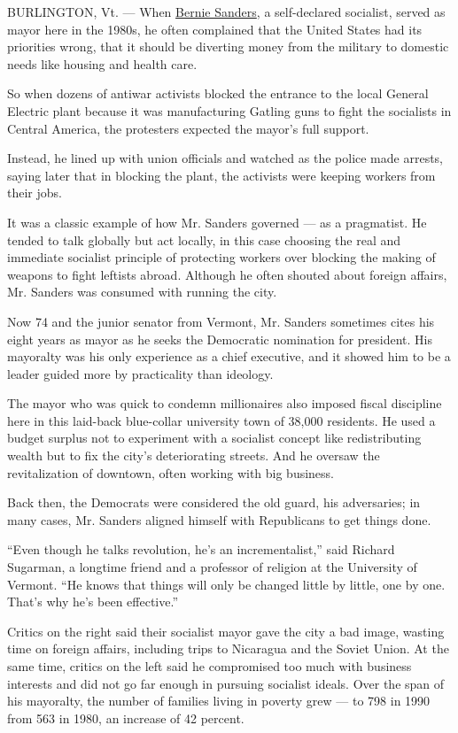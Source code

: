 BURLINGTON, Vt. --- When
\href{http://www.nytimes3xbfgragh.onion/interactive/2015/05/01/us/elections/bernie-sanders.html?inline=nyt-per}{Bernie
Sanders}, a self-declared socialist, served as mayor here in the 1980s,
he often complained that the United States had its priorities wrong,
that it should be diverting money from the military to domestic needs
like housing and health care.

So when dozens of antiwar activists blocked the entrance to the local
General Electric plant because it was manufacturing Gatling guns to
fight the socialists in Central America, the protesters expected the
mayor's full support.

Instead, he lined up with union officials and watched as the police made
arrests, saying later that in blocking the plant, the activists were
keeping workers from their jobs.

It was a classic example of how Mr. Sanders governed --- as a
pragmatist. He tended to talk globally but act locally, in this case
choosing the real and immediate socialist principle of protecting
workers over blocking the making of weapons to fight leftists abroad.
Although he often shouted about foreign affairs, Mr. Sanders was
consumed with running the city.

Now 74 and the junior senator from Vermont, Mr. Sanders sometimes cites
his eight years as mayor as he seeks the Democratic nomination for
president. His mayoralty was his only experience as a chief executive,
and it showed him to be a leader guided more by practicality than
ideology.

The mayor who was quick to condemn millionaires also imposed fiscal
discipline here in this laid-back blue-collar university town of 38,000
residents. He used a budget surplus not to experiment with a socialist
concept like redistributing wealth but to fix the city's deteriorating
streets. And he oversaw the revitalization of downtown, often working
with big business.

Back then, the Democrats were considered the old guard, his adversaries;
in many cases, Mr. Sanders aligned himself with Republicans to get
things done.

``Even though he talks revolution, he's an incrementalist,'' said
Richard Sugarman, a longtime friend and a professor of religion at the
University of Vermont. ``He knows that things will only be changed
little by little, one by one. That's why he's been effective.''

Critics on the right said their socialist mayor gave the city a bad
image, wasting time on foreign affairs, including trips to Nicaragua and
the Soviet Union. At the same time, critics on the left said he
compromised too much with business interests and did not go far enough
in pursuing socialist ideals. Over the span of his mayoralty, the number
of families living in poverty grew --- to 798 in 1990 from 563 in 1980,
an increase of 42 percent.

